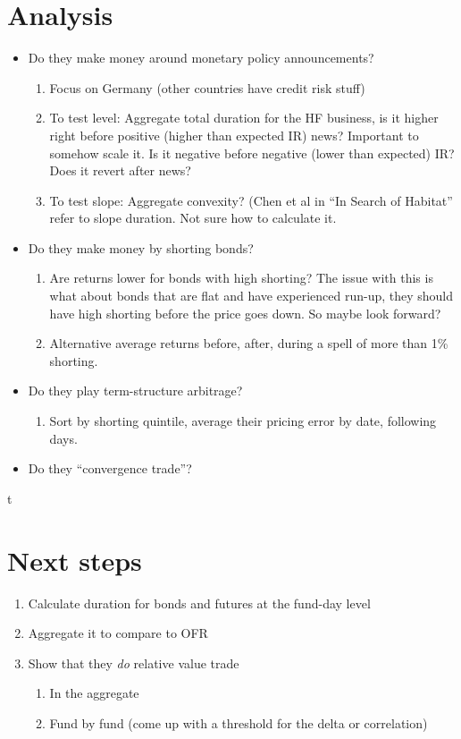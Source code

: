 \documentclass[12pt]{article}
\begin{document}
\section{Analysis}
\begin{itemize}
    \item Do they make money around monetary policy announcements? 
    \begin{enumerate}
        \item Focus on Germany (other countries have credit risk stuff)
        \item To test level: Aggregate total duration for the HF business, is it higher right before positive (higher than expected IR) news? Important to somehow scale it. Is it negative before negative (lower than expected) IR? Does it revert after news? 
        \item To test slope: Aggregate convexity? (Chen et al in ``In Search of Habitat'' refer to slope duration. Not sure how to calculate it.      
    \end{enumerate}
    \item Do they make money by shorting bonds? 
    \begin{enumerate}
        \item Are returns lower for bonds with high shorting? The issue with this is what about bonds that are flat and have experienced run-up, they should have high shorting before the price goes down. So maybe look forward? 
        \item Alternative average returns before, after, during a spell of more than 1\% shorting.
    \end{enumerate}
    \item Do they play term-structure arbitrage? 
    \begin{enumerate}
        \item Sort by shorting quintile, average their pricing error by date, following days.
    \end{enumerate}
    \item Do they ``convergence trade''? 
\end{itemize}t
\section{Next steps}
\begin{enumerate}[label=\arabic*.]
    \item Calculate duration for bonds and futures at the fund-day level
    \item Aggregate it to compare to OFR
    \item Show that they \textit{do} relative value trade
    \begin{enumerate}[label=\alph*.]
        \item In the aggregate
        \item Fund by fund (come up with a threshold for the delta or correlation) 
    \end{enumerate}
\end{enumerate}
    
\end{document}
